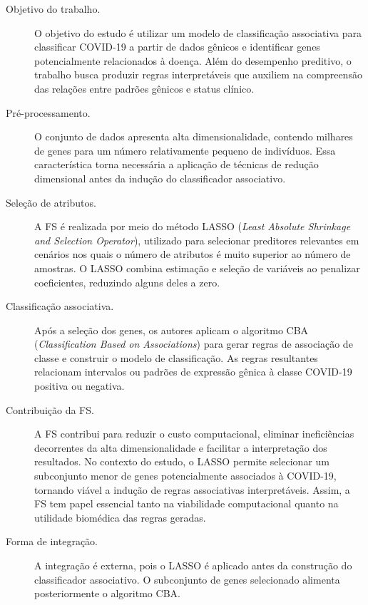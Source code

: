 \begin{description}
    \item[Objetivo do trabalho.] O objetivo do estudo é utilizar um modelo de classificação associativa para classificar COVID-19 a partir de dados gênicos e identificar genes potencialmente relacionados à doença. Além do desempenho preditivo, o trabalho busca produzir regras interpretáveis que auxiliem na compreensão das relações entre padrões gênicos e status clínico.

    \item[Pré-processamento.] O conjunto de dados apresenta alta dimensionalidade, contendo milhares de genes para um número relativamente pequeno de indivíduos. Essa característica torna necessária a aplicação de técnicas de redução dimensional antes da indução do classificador associativo.

    \item[Seleção de atributos.] A FS é realizada por meio do método LASSO (\textit{Least Absolute Shrinkage and Selection Operator}), utilizado para selecionar preditores relevantes em cenários nos quais o número de atributos é muito superior ao número de amostras. O LASSO combina estimação e seleção de variáveis ao penalizar coeficientes, reduzindo alguns deles a zero.

    \item[Classificação associativa.] Após a seleção dos genes, os autores aplicam o algoritmo CBA (\textit{Classification Based on Associations}) para gerar regras de associação de classe e construir o modelo de classificação. As regras resultantes relacionam intervalos ou padrões de expressão gênica à classe COVID-19 positiva ou negativa.

    \item[Contribuição da FS.] A FS contribui para reduzir o custo computacional, eliminar ineficiências decorrentes da alta dimensionalidade e facilitar a interpretação dos resultados. No contexto do estudo, o LASSO permite selecionar um subconjunto menor de genes potencialmente associados à COVID-19, tornando viável a indução de regras associativas interpretáveis. Assim, a FS tem papel essencial tanto na viabilidade computacional quanto na utilidade biomédica das regras geradas.

    \item[Forma de integração.] A integração é externa, pois o LASSO é aplicado antes da construção do classificador associativo. O subconjunto de genes selecionado alimenta posteriormente o algoritmo CBA.
\end{description}


